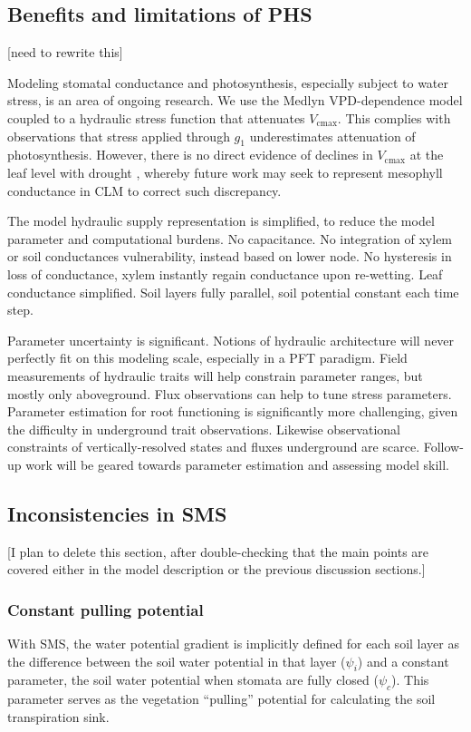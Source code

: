 \documentclass[draft,linenumbers]{agujournal}
\begin{document}
\subsection{Benefits and limitations of PHS}

[need to rewrite this]

Modeling stomatal conductance and photosynthesis, especially subject to water stress, is an area of ongoing research. We use the Medlyn VPD-dependence model coupled to a hydraulic stress function that attenuates $V_{\text{cmax}}$. This complies with observations \citep{lin2018,zhou2013} that stress applied through $g_1$ underestimates attenuation of photosynthesis. However, there is no direct evidence of declines in $V_{\text{cmax}}$ at the leaf level with drought \citep{flexas2006}, whereby future work may seek to represent mesophyll conductance in CLM to correct such discrepancy.
    
    The model hydraulic supply representation is simplified, to reduce the model parameter and computational burdens.
    No capacitance.
    No integration of xylem or soil conductances vulnerability, instead based on lower node.
    No hysteresis in loss of conductance, xylem instantly regain conductance upon re-wetting.
    Leaf conductance simplified.
    Soil layers fully parallel, soil potential constant each time step.
    
    Parameter uncertainty is significant.
    Notions of hydraulic architecture will never perfectly fit on this modeling scale, especially in a PFT paradigm.
    Field measurements of hydraulic traits will help constrain parameter ranges, but mostly only aboveground.
    Flux observations can help to tune stress parameters.
    Parameter estimation for root functioning is significantly more challenging, given the difficulty in underground trait observations.
    Likewise observational constraints of vertically-resolved states and fluxes underground are scarce.
    Follow-up work will be geared towards parameter estimation and assessing model skill.

\subsection{Inconsistencies in SMS}
[I plan to delete this section, after double-checking that the main points are covered either in the model description or the previous discussion sections.]
    
    \subsubsection{Constant pulling potential}
    With SMS, the water potential gradient is implicitly defined for each soil layer as the difference between the soil water potential in that layer ($\psi_i$) and a constant parameter, the soil water potential when stomata are fully closed ($\psi_{c}$). This parameter serves as the vegetation ``pulling'' potential for calculating the soil transpiration sink.
    
\end{document}
